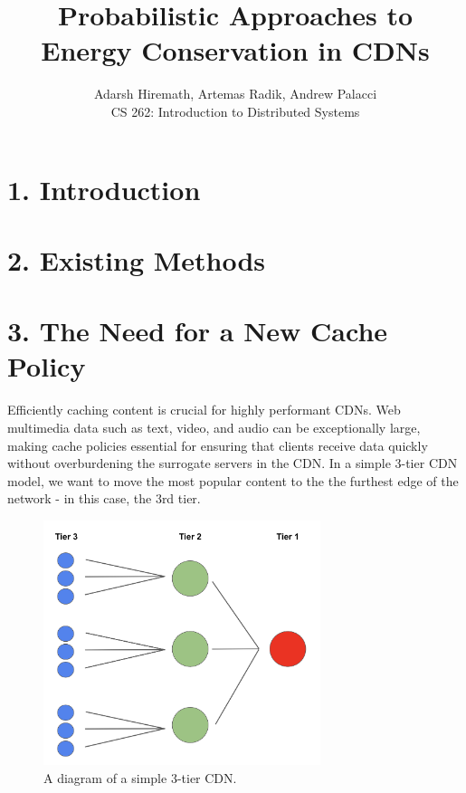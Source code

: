 \documentclass[
	a4paper, %
	10pt, %
	unnumberedsections, %
	twoside, %
]{LTJournalArticle}
\title{Probabilistic Approaches to 
\\ Energy Conservation in CDNs} %
\author{%
	Adarsh Hiremath, Artemas Radik, Andrew Palacci \\
	CS 262: Introduction to Distributed Systems \\
}
\begin{document}
\maketitle %


\begin{abstract}
\end{abstract}
\section{1. Introduction}

\section{2. Existing Methods}

\section{3. The Need for a New Cache Policy}

Efficiently caching content is crucial for highly performant CDNs. Web multimedia data such as text, video, and audio can be exceptionally large, making cache policies essential for ensuring that clients receive data quickly without overburdening the surrogate servers in the CDN. In a simple 3-tier CDN model, we want to move the most popular content to the the furthest edge of the network - in this case, the 3rd tier.  

\begin{figure}[h]
	\begin{center}
		\includegraphics[width=8.1cm]{tier.png}
	\end{center}
	\caption{A diagram of a simple 3-tier CDN.}	
\end{figure}
\end{document}
